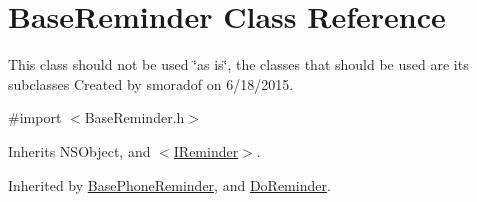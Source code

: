 \hypertarget{interface_base_reminder}{}\section{Base\+Reminder Class Reference}
\label{interface_base_reminder}


This class should not be used \char`\"{}as is\char`\"{}, the classes that should be used are it\textquotesingle{}s subclasses Created by smoradof on 6/18/2015.  




{\ttfamily \#import $<$Base\+Reminder.\+h$>$}



Inherits N\+S\+Object, and \hyperlink{protocol_i_reminder-p}{$<$\+I\+Reminder$>$}.



Inherited by \hyperlink{interface_base_phone_reminder}{Base\+Phone\+Reminder}, and \hyperlink{interface_do_reminder}{Do\+Reminder}.


